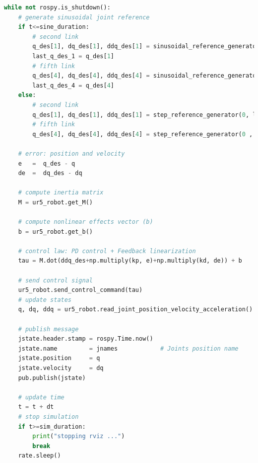 \begin{lstlisting}[language=Python,caption={Move the second and fifth joint of UR5 robot with the required movement of activity 2.1.}, label={lst:inverse_dynamics_control}]
while not rospy.is_shutdown():
    # generate sinusoidal joint reference
    if t<=sine_duration:
        # second link
        q_des[1], dq_des[1], ddq_des[1] = sinusoidal_reference_generator(q0[1], dq0[1], ddq0[1], 0.2, 1, t)
        last_q_des_1 = q_des[1]
        # fifth link
        q_des[4], dq_des[4], ddq_des[4] = sinusoidal_reference_generator(q0[4], dq0[4], ddq0[4], 0.4, 1.5, t)  
        last_q_des_4 = q_des[4]  
    else:
        # second link
        q_des[1], dq_des[1], ddq_des[1] = step_reference_generator(0, last_q_des_1)
        # fifth link
        q_des[4], dq_des[4], ddq_des[4] = step_reference_generator(0 , last_q_des_4)

    # error: position and velocity
    e 	=  q_des - q
    de 	=  dq_des - dq    

    # compute inertia matrix
    M = ur5_robot.get_M()

    # compute nonlinear effects vector (b)
    b = ur5_robot.get_b()   

    # control law: PD control + Feedback linearization
    tau = M.dot(ddq_des+np.multiply(kp, e)+np.multiply(kd, de)) + b

    # send control signal
    ur5_robot.send_control_command(tau)
    # update states
    q, dq, ddq = ur5_robot.read_joint_position_velocity_acceleration()

    # publish message
    jstate.header.stamp = rospy.Time.now()
    jstate.name 		= jnames			# Joints position name
    jstate.position 	= q
    jstate.velocity 	= dq
    pub.publish(jstate)

    # update time
    t = t + dt
    # stop simulation
    if t>=sim_duration:
        print("stopping rviz ...")
        break
    rate.sleep()
\end{lstlisting}


